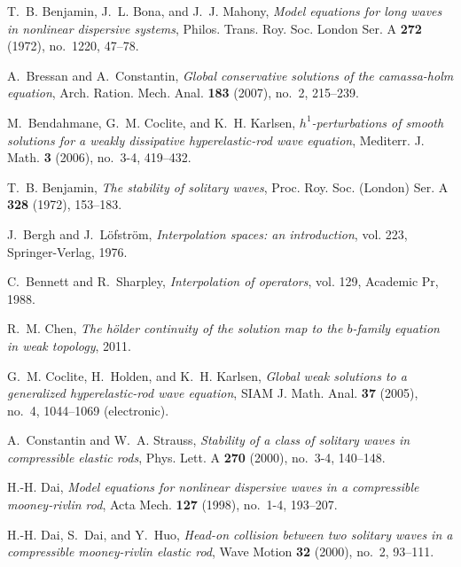 \documentclass[12pt,reqno]{amsart}
\numberwithin{equation}{section}  %
\numberwithin{figure}{section}
\begin{document}
\begin{thebibliography}{HKM09}

T.~B. Benjamin, J.~L. Bona, and J.~J. Mahony, \emph{Model equations for long
  waves in nonlinear dispersive systems}, Philos. Trans. Roy. Soc. London Ser.
  A \textbf{272} (1972), no.~1220, 47--78.

A.~Bressan and A.~Constantin, \emph{Global conservative solutions of the
  camassa-holm equation}, Arch. Ration. Mech. Anal. \textbf{183} (2007), no.~2,
  215--239.

M.~Bendahmane, G.~M. Coclite, and K.~H. Karlsen, \emph{$h^1$-perturbations of
  smooth solutions for a weakly dissipative hyperelastic-rod wave equation},
  Mediterr. J. Math. \textbf{3} (2006), no.~3-4, 419--432.

T.~B. Benjamin, \emph{The stability of solitary waves}, Proc. Roy. Soc.
  (London) Ser. A \textbf{328} (1972), 153--183.

J.~Bergh and J.~L{\"o}fstr{\"o}m, \emph{Interpolation spaces: an introduction},
  vol. 223, Springer-Verlag, 1976.

C.~Bennett and R.~Sharpley, \emph{Interpolation of operators}, vol. 129,
  Academic Pr, 1988.

R.~M. Chen, \emph{The h{\"o}lder continuity of the solution map to the
  $b$-family equation in weak topology}, 2011.

G.~M. Coclite, H.~Holden, and K.~H. Karlsen, \emph{Global weak solutions to a
  generalized hyperelastic-rod wave equation}, SIAM J. Math. Anal. \textbf{37}
  (2005), no.~4, 1044--1069 (electronic).

A.~Constantin and W.~A. Strauss, \emph{Stability of a class of solitary waves
  in compressible elastic rods}, Phys. Lett. A \textbf{270} (2000), no.~3-4,
  140--148.

H.-H. Dai, \emph{Model equations for nonlinear dispersive waves in a
  compressible mooney-rivlin rod}, Acta Mech. \textbf{127} (1998), no.~1-4,
  193--207.

H.-H. Dai, S.~Dai, and Y.~Huo, \emph{Head-on collision between two solitary
  waves in a compressible mooney-rivlin elastic rod}, Wave Motion \textbf{32}
  (2000), no.~2, 93--111.


\end{thebibliography}
\end{document}
